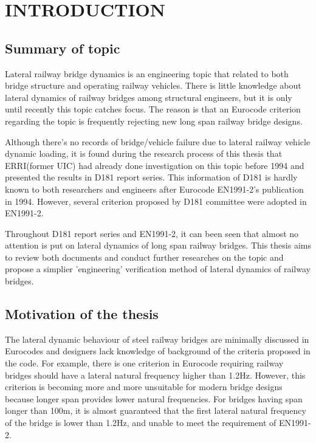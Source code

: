 

\chapter{INTRODUCTION}

\section{Summary of topic}


Lateral railway bridge dynamics is an engineering topic that related to both bridge structure and operating railway vehicles. There is little knowledge about lateral dynamics of railway bridges among structural engineers, but it is only until recently this topic catches focus. The reason is that an Eurocode criterion regarding the topic is frequently rejecting new long span railway bridge designs. 

Although there's no records of bridge/vehicle failure due to lateral railway vehicle dynamic loading, it is found during the research process of this thesis that ERRI(former UIC) had already done investigation on this topic before 1994 and presented the results in D181 report series. This information of D181 is hardly known to both researchers and engineers after Eurocode EN1991-2's publication in 1994. However, several criterion proposed by D181 committee were adopted in EN1991-2.

Throughout D181 report series and EN1991-2, it can been seen that almost no attention is put on lateral dynamics of long span railway bridges. This thesis aims to review both documents and conduct further researches on the topic and propose a simplier 'engineering' verification method of lateral dynamics of railway bridges.

\section{Motivation of the thesis}

The lateral dynamic behaviour of steel railway bridges are minimally discussed in Eurocodes and designers lack knowledge of background of the criteria proposed in the code. For example, there is one criterion in Eurocode requiring railway bridges should have a lateral natural frequency higher than 1.2Hz. However, this criterion is becoming more and more unsuitable for modern bridge designs because longer span provides lower natural frequencies. For bridges having span longer than 100m, it is almost guaranteed that the first lateral natural frequency of the bridge is lower than 1.2Hz, and unable to meet the requirement of EN1991-2. 

